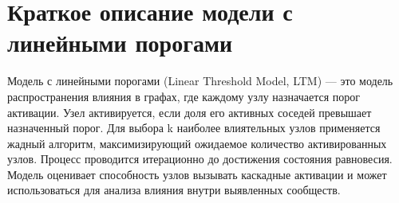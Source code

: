 \chapter{Краткое описание модели с линейными порогами}

Модель с линейными порогами (Linear Threshold Model, LTM) --- это модель распространения влияния в графах, где каждому узлу назначается порог активации. Узел активируется, если доля его активных соседей превышает назначенный порог. Для выбора k наиболее влиятельных узлов применяется жадный алгоритм, максимизирующий ожидаемое количество активированных узлов. Процесс проводится итерационно до достижения состояния равновесия. Модель оценивает способность узлов вызывать каскадные активации и может использоваться для анализа влияния внутри выявленных сообществ.



\clearpage
